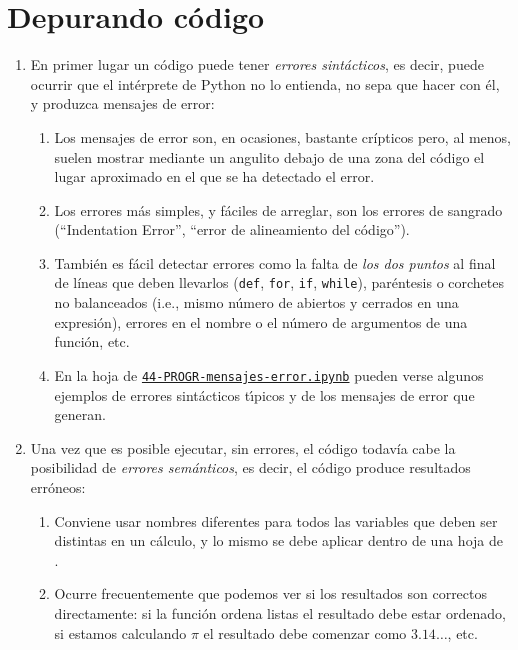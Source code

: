 \section{Depurando código}\label{depurar}

\begin{enumerate}
 \item En primer lugar un código puede tener {\itshape errores sintácticos},
es decir, puede ocurrir que el intérprete de Python no lo entienda, no sepa
que hacer con él, y produzca mensajes de error:
\begin{enumerate}
 \item  Los mensajes de error son, en ocasiones,  bastante cr\'ipticos pero, al
menos, suelen mostrar mediante un angulito  debajo de una zona del código el
lugar aproximado en el que se ha detectado el error. 
\item Los errores más simples, y fáciles de arreglar, son los errores de
sangrado (``Indentation Error'', ``error de alineamiento del código'').

\item También es fácil detectar errores como la falta de {\itshape los dos
puntos} al final de líneas que deben llevarlos (\lstinline|def|,
\lstinline|for|, 
\lstinline|if|, \lstinline|while|),
paréntesis o corchetes no balanceados (i.e., mismo número de abiertos
y cerrados en una expresión), errores en el nombre o el número de argumentos
de una función, etc.
\item En la hoja de {\sage} 
\href{http://localhost:8888/notebooks/PROGR/44-PROGR-mensajes-error.ipynb}{\tt 44-PROGR-mensajes-error.ipynb}
pueden verse algunos ejemplos de errores sint\'acticos t\'{\i}picos y de los
mensajes de error que generan. 
\end{enumerate}

\item Una vez que es posible ejecutar, sin errores,  el código todavía
cabe la posibilidad de {\itshape errores semánticos}, es decir, el código
produce resultados erróneos:

\begin{enumerate}
\item Conviene usar {\sc nombres diferentes} para todos las variables que deben
ser distintas en un cálculo, y lo mismo se debe aplicar
dentro de una hoja de {\sage}. 
 \item Ocurre frecuentemente que podemos ver si los resultados son correctos
directamente: si la función ordena listas el resultado debe estar ordenado, si
estamos calculando $\pi$ el resultado debe comenzar como $3{.}14\dots$, etc. 


\end{enumerate}
\end{enumerate}
